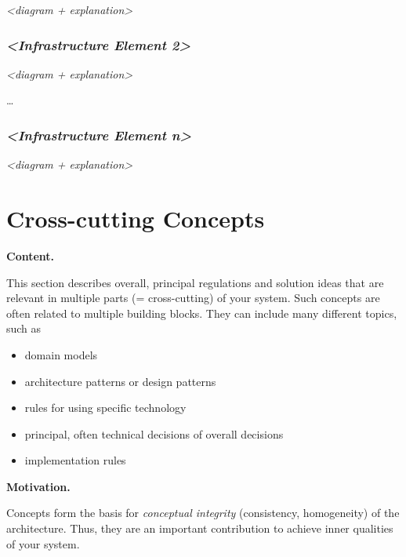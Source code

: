 \documentclass[]{article}
\begin{document}
\emph{\textless{}diagram + explanation\textgreater{}}

\hypertarget{__emphasis_infrastructure_element_2_emphasis}{%
\subsubsection{\texorpdfstring{\emph{\textless{}Infrastructure Element
2\textgreater{}}}{\textless{}Infrastructure Element 2\textgreater{}}}\label{__emphasis_infrastructure_element_2_emphasis}}

\emph{\textless{}diagram + explanation\textgreater{}}

\ldots{}

\hypertarget{__emphasis_infrastructure_element_n_emphasis}{%
\subsubsection{\texorpdfstring{\emph{\textless{}Infrastructure Element
n\textgreater{}}}{\textless{}Infrastructure Element n\textgreater{}}}\label{__emphasis_infrastructure_element_n_emphasis}}

\emph{\textless{}diagram + explanation\textgreater{}}

\hypertarget{section-concepts}{%
\section{Cross-cutting Concepts}\label{section-concepts}}

\textbf{Content.}

This section describes overall, principal regulations and solution ideas
that are relevant in multiple parts (= cross-cutting) of your system.
Such concepts are often related to multiple building blocks. They can
include many different topics, such as

\begin{itemize}
\item
  domain models
\item
  architecture patterns or design patterns
\item
  rules for using specific technology
\item
  principal, often technical decisions of overall decisions
\item
  implementation rules
\end{itemize}

\textbf{Motivation.}

Concepts form the basis for \emph{conceptual integrity} (consistency,
homogeneity) of the architecture. Thus, they are an important
contribution to achieve inner qualities of your system.
\end{document}
